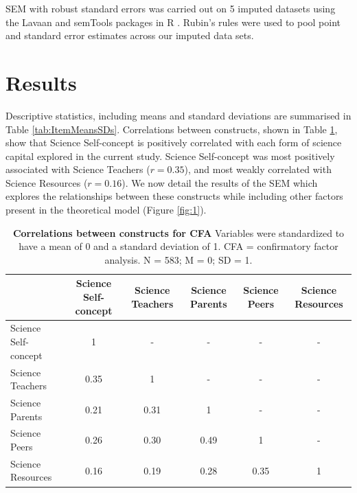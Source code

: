 SEM with robust standard errors \cite{huber1967behavior,white1982maximum} was carried out on 5 imputed datasets using the Lavaan \cite{rosseel2012lavaan} and semTools \cite{jorgensen2018package} packages in R \cite{team2013r}. Rubin's rules \cite{rubin2004multiple} were used to pool point and standard error estimates across our imputed data sets. 


\section*{Results}
\label{results}
Descriptive statistics, including means and standard deviations are summarised in Table \ref{tab:ItemMeansSDs}. Correlations between constructs, shown in Table \ref{tab:Correlations}, show that Science Self-concept is positively correlated with each form of science capital explored in the current study. Science Self-concept was most positively associated with Science Teachers ($r = 0.35$), and most weakly correlated with Science Resources ($r = 0.16$). We now detail the results of the SEM which explores the relationships between these constructs while including other factors present in the theoretical model (Figure \ref{fig:1}).

\begin{table}[h]
\label{tab:Correlations}       %
\begin{tabular}{lccccc}
\cline{2-6}
                  & Science Self-concept & Science Teachers & Science Parents & Science Peers & Science Resources \\ \hline
Science Self-concept  & 1                & -                & -               & -             & -                 \\
Science Teachers  & 0.35            & 1                & -               & -             & -                 \\
Science Parents   & 0.21            & 0.31            & 1               & -             & -                 \\
Science Peers     & 0.26            & 0.30            & 0.49            & 1             & -                 \\
Science Resources & 0.16            & 0.19            & 0.28           & 0.35         & 1                 \\ \hline
\end{tabular}
\caption{\textbf{Correlations between constructs for CFA}  Variables were standardized to have a mean of 0 and a standard deviation of 1. CFA =
confirmatory factor analysis. N = 583; M = 0; SD = 1.}
\end{table}

